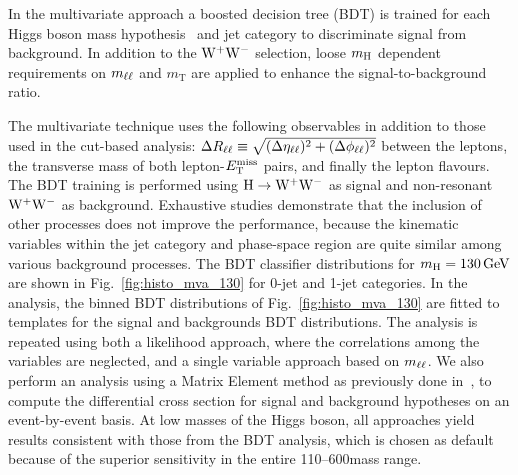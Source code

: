\documentclass[11pt,twoside,a4paper,cmspaper,final,collab]{cms-tdr}
\begin{document}
In the multivariate approach a boosted decision tree (BDT)
is trained for each Higgs boson mass hypothesis~\cite{tmva} and jet category
to discriminate signal from background. In addition to the $\mathrm{W^+}{}\mathrm{W^-}$ selection,
loose $m_{\mathrm{H}}$ dependent requirements on $m_{\mathrm{\ell}\mathrm{\ell}}$ and
$m_\mathrm{T}$ are applied to enhance the signal-to-background ratio.

The multivariate technique
uses the following observables in addition to those used in the cut-based
analysis: $\Delta R_{\mathrm{\ell}\mathrm{\ell}}\equiv\sqrt{(\Delta\eta_{\mathrm{\ell}\mathrm{\ell}})^2 + (\Delta\phi_{\mathrm{\ell}\mathrm{\ell}})^2}$
between the leptons, the transverse mass of both lepton-$E_{\mathrm{T}}^{\text{miss}}$ pairs, and finally
the lepton flavours.
The BDT training is performed using $\mathrm{H}\to\mathrm{W^+}{}\mathrm{W^-}$ as signal and non-resonant
$\mathrm{W^+}{}\mathrm{W^-}$ as background. Exhaustive studies demonstrate that
the inclusion of other processes does not improve
the performance, because the kinematic variables within the jet category and phase-space
region are quite similar among various background processes.
The BDT classifier distributions for $m_{\mathrm{H}}=130\,\text{Ge\hspace{-.08em}V}$ are shown in
Fig.~\ref{fig:histo_mva_130} for 0-jet and 1-jet categories. In the analysis, the binned
BDT distributions of Fig.~\ref{fig:histo_mva_130} are fitted to templates for the signal and
backgrounds BDT distributions.
The analysis is repeated using both a likelihood approach,
where the correlations among the variables are neglected, and a single
variable approach based on $m_{\mathrm{\ell}\mathrm{\ell}}$.
We also perform an analysis using a Matrix Element
method as previously done in~\cite{Aaltonen:2008ec}, to compute the differential cross section
for signal and background hypotheses on an event-by-event basis.
At low masses of the Higgs boson, all approaches yield results
consistent with those from the BDT analysis,
which is chosen as default because of the superior sensitivity in the entire 110--600\GeV mass range.
\end{document}
